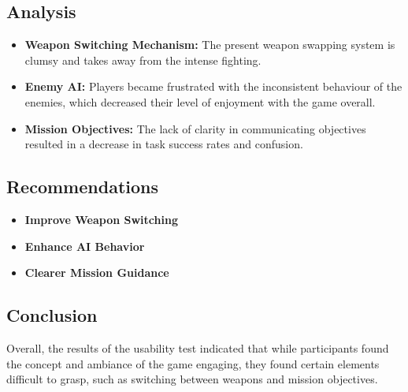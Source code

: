 	\subsection{Analysis}
	\begin{itemize}
		\item \textbf{Weapon Switching Mechanism:}
		The present weapon swapping system is clumsy and takes away from the intense fighting.
		\item \textbf{Enemy AI:}
		Players became frustrated with the inconsistent behaviour of the enemies, which decreased their level of enjoyment with the game overall.
		\item \textbf{Mission Objectives:}
		The lack of clarity in communicating objectives resulted in a decrease in task success rates and confusion.
	\end{itemize}
		\subsection{Recommendations}
	\begin{itemize}
		\item \textbf{Improve Weapon Switching}

		\item \textbf{Enhance AI Behavior}
		\item \textbf{Clearer Mission Guidance}
	\end{itemize}
	\subsection{Conclusion}
	Overall, the results of the usability test indicated that while participants found the concept and ambiance of the game engaging, they found certain elements difficult to grasp, such as switching between weapons and mission objectives.














